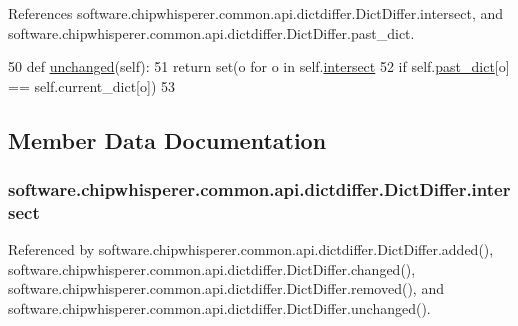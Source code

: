 References software.\+chipwhisperer.\+common.\+api.\+dictdiffer.\+Dict\+Differ.\+intersect, and software.\+chipwhisperer.\+common.\+api.\+dictdiffer.\+Dict\+Differ.\+past\+\_\+dict.


\begin{DoxyCode}
50     \textcolor{keyword}{def }\hyperlink{classsoftware_1_1chipwhisperer_1_1common_1_1api_1_1dictdiffer_1_1DictDiffer_a40986c4add584a4d2ef51cc564f7ab4c}{unchanged}(self):
51         \textcolor{keywordflow}{return} set(o \textcolor{keywordflow}{for} o \textcolor{keywordflow}{in} self.\hyperlink{classsoftware_1_1chipwhisperer_1_1common_1_1api_1_1dictdiffer_1_1DictDiffer_a6b8cde04fc1f5bc7aa9339ed42fb2a29}{intersect}
52                    \textcolor{keywordflow}{if} self.\hyperlink{classsoftware_1_1chipwhisperer_1_1common_1_1api_1_1dictdiffer_1_1DictDiffer_a5ea256bc3eaea57ca7b5c0fedafa7f26}{past\_dict}[o] == self.current\_dict[o])
53 \end{DoxyCode}


\subsection{Member Data Documentation}
\hypertarget{classsoftware_1_1chipwhisperer_1_1common_1_1api_1_1dictdiffer_1_1DictDiffer_a6b8cde04fc1f5bc7aa9339ed42fb2a29}{}
\subsubsection[{intersect}]{\setlength{\rightskip}{0pt plus 5cm}software.\+chipwhisperer.\+common.\+api.\+dictdiffer.\+Dict\+Differ.\+intersect}\label{classsoftware_1_1chipwhisperer_1_1common_1_1api_1_1dictdiffer_1_1DictDiffer_a6b8cde04fc1f5bc7aa9339ed42fb2a29}


Referenced by software.\+chipwhisperer.\+common.\+api.\+dictdiffer.\+Dict\+Differ.\+added(), software.\+chipwhisperer.\+common.\+api.\+dictdiffer.\+Dict\+Differ.\+changed(), software.\+chipwhisperer.\+common.\+api.\+dictdiffer.\+Dict\+Differ.\+removed(), and software.\+chipwhisperer.\+common.\+api.\+dictdiffer.\+Dict\+Differ.\+unchanged().

\hypertarget{classsoftware_1_1chipwhisperer_1_1common_1_1api_1_1dictdiffer_1_1DictDiffer_a5ea256bc3eaea57ca7b5c0fedafa7f26}{}
